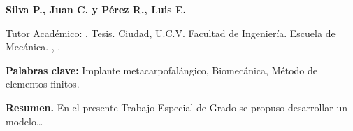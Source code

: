 
\begin{center}
    {\normalfont\bfseries Silva P., Juan C. y Pérez R., Luis E.}
\end{center}

\vspace*{\baselineskip}
\begin{center}
{\changefontsizes{14pt} \normalfont\bfseries \MakeUppercase{\tesis}}
\end{center}

\vspace*{2\baselineskip}

Tutor Académico: \tutor. Tesis. Ciudad, U.C.V. Facultad de Ingeniería. Escuela de Mecánica. \the\year, \pageref{LastPage}.

\vspace*{2\baselineskip}

{\normalfont\bfseries Palabras clave:} Implante metacarpofalángico, Biomecánica, Método de elementos finitos.

\vspace*{2\baselineskip}

{\normalfont\bfseries Resumen.} En el presente Trabajo Especial de Grado se propuso desarrollar un modelo…

